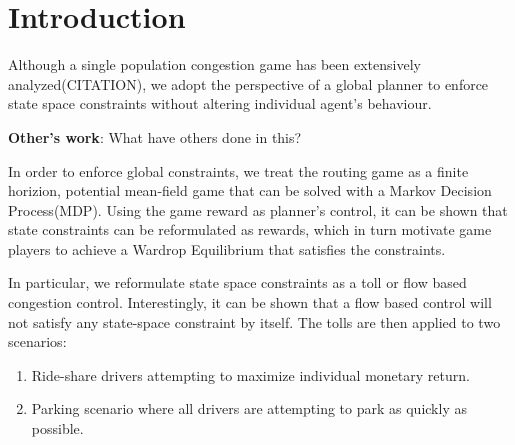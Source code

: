 \section{Introduction}
\cite{altman1999constrained}
Although a single population congestion game has been extensively analyzed(CITATION), we adopt the perspective of a global planner to enforce state space constraints without altering individual agent's behaviour. \newline

\textbf{Other's work}: What have others done in this? \newline

In order to enforce global constraints, we treat the routing game as a finite horizion, potential mean-field game that can be solved with a Markov Decision Process(MDP). Using the game reward as planner's control, it can be shown that state constraints can be reformulated as rewards, which in turn motivate game players to achieve a Wardrop Equilibrium that satisfies the constraints. 

In particular, we reformulate state space constraints as a toll or flow based congestion control. Interestingly, it can be shown that a flow based control will not satisfy any state-space constraint by itself. The tolls are then applied to two scenarios: 
\begin{enumerate}
\item Ride-share drivers attempting to maximize individual monetary return.
\item Parking scenario where all drivers are attempting to park as quickly as possible. 
\end{enumerate}